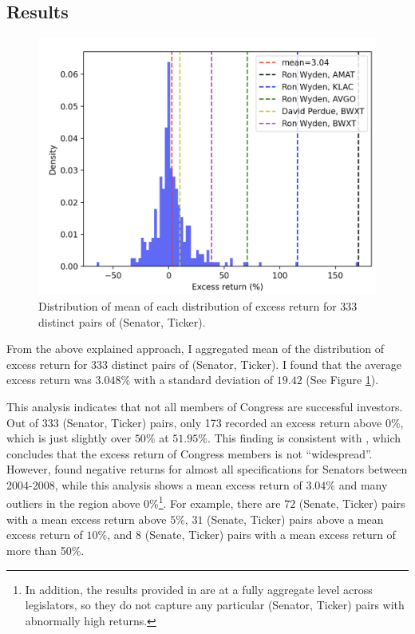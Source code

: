 \documentclass[12pt,letterpaper]{article}
\begin{document}
\subsection{Results}

\begin{figure}[h!]
  \centering
  \includegraphics[width=1\textwidth]{imgs/ex-r/aggregate.png}
  \caption{Distribution of mean of each distribution of excess return for $333$ distinct pairs of (Senator, Ticker).}
  \label{fig:agg-ex-r}
\end{figure}

From the above explained approach, I aggregated mean of the distribution of excess return for $333$ distinct pairs of (Senator, Ticker). I found that the average excess return was $3.048\%$ with a standard deviation of $19.42$ (See Figure \ref{fig:agg-ex-r}). 

This analysis indicates that not all members of Congress are successful investors. Out of 333 (Senator, Ticker) pairs, only 173 recorded an excess return above $0\%$, which is just slightly over $50\%$ at $51.95\%$. This finding is consistent with \cite{eg13}, 
which concludes that the excess return of Congress members is not ``widespread''. However, \cite{eg13} found negative returns for almost all specifications for Senators between 2004-2008, 
while this analysis shows a mean excess return of $3.04\%$ and many outliers in the region above 0\%\footnote{In addition, the results provided in \cite{eg13} are at a fully aggregate level across legislators, so they do not capture any particular (Senator, Ticker) pairs with abnormally high returns.}. 
For example, there are $72$ (Senate, Ticker) pairs with a mean excess return above $5\%$, $31$ (Senate, Ticker) pairs above a mean excess return of $10\%$, and $8$ (Senate, Ticker) pairs with a mean excess return of more than 50\%.
\end{document}
